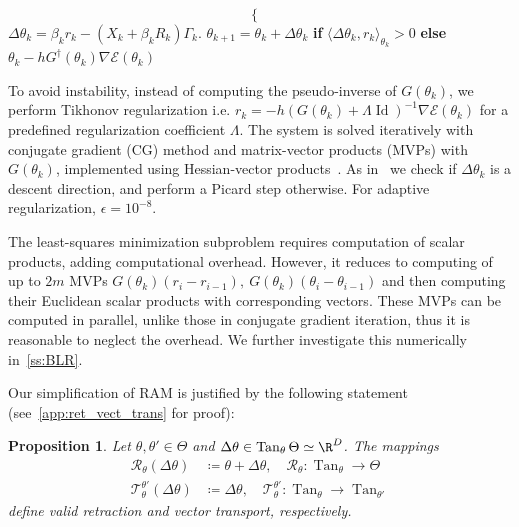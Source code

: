 \documentclass{article} %
\newtheorem{proposition}{Proposition}[section]
\numberwithin{equation}{subsection}
\numberwithin{theorem}{section}
\newcommand{\cE}{\mathcal{E}}
\newcommand{\cR}{\mathcal{R}}
\newcommand{\cT}{\mathcal{T}}
\newcommand{\Id}{\operatorname{Id}}
\begin{document}
\begin{algorithm}[ht]
\begin{algorithmic}[1]
\begin{equation*}
\begin{cases}
                            \end{cases}
                \end{equation*}
                \STATE $\Delta\theta_{k} = \beta_k r_k -\left(X_k + \beta_k R_k\right)\Gamma_k$.
                \STATE $\theta_{k+1} = \theta_k + \Delta\theta_k$ 
                    \textbf{ if } $\langle \Delta\theta_{k}, r_k \rangle_{\theta_k} > 0$
                    \textbf{ else } $\theta_k -hG^\dagger(\theta_k)\nabla\cE(\theta_k)$
                \ENDFOR
            \end{algorithmic}
        \end{algorithm}
        
    To avoid instability, instead of computing the pseudo-inverse of $G(\theta_k)$, we perform Tikhonov regularization i.e. $r_k = -h\left(G(\theta_k) + \Lambda\Id \right)^{-1}\nabla\cE(\theta_k)$ for a predefined regularization coefficient $\Lambda$.
    The system is solved iteratively with conjugate gradient (CG) method and matrix-vector products (MVPs) with $G(\theta_k)$, implemented using Hessian-vector products~\cite{pearlmutter1994fast}. 
    As in~\cite{wei2021stochastic} we check if $\Delta\theta_k$ is a descent direction, and perform a Picard step otherwise. For adaptive regularization, $\epsilon = 10^{-8}$.

    The least-squares minimization subproblem requires computation of scalar products, adding computational overhead. 
    However, it reduces to computing of up to $2m$ MVPs $G(\theta_k)(r_i - r_{i-1}),\ G(\theta_k)(\theta_i - \theta_{i-1})$ and then computing their Euclidean scalar products with corresponding vectors. 
    These MVPs can be computed in parallel, unlike those in conjugate gradient iteration, thus it is reasonable to neglect the overhead. 
    We further investigate this numerically in~\autoref{ss:BLR}.

    Our simplification of RAM is justified by the following statement (see~\ref{app:ret_vect_trans} for proof):
    \begin{proposition}
        Let $\theta, \theta' \in \Theta$ and $\Delta\theta \in \operatorname{Tan}_{\theta}\Theta \simeq \R^D$.
        The mappings
        \begin{align}
            \cR_{\theta} (\Delta\theta) &\coloneqq  \theta + \Delta\theta,\quad 
                 \cR_\theta: \operatorname{Tan}_\theta \to \Theta \label{eq:triv_retraction}\\
            \cT_{\theta}^{\theta'}(\Delta\theta) &\coloneqq  \Delta\theta,\quad
                 \cT_{\theta}^{\theta'}: \operatorname{Tan}_\theta \to \operatorname{Tan}_{\theta'} \label{eq:triv_vt}
        \end{align}
        define valid retraction and vector transport, respectively.
    \end{proposition}
\end{document}
